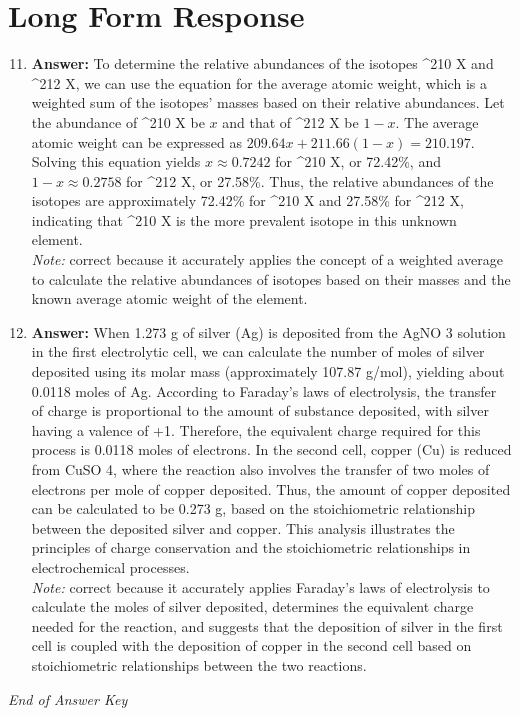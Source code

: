 \documentclass[12pt]{article}
\begin{document}
\section*{Long Form Response}
\begin{enumerate}[label=\arabic*.]
\setcounter{enumi}{10}
\item \textbf{Answer:} To determine the relative abundances of the isotopes ^210 X and ^212 X, we can use the equation for the average atomic weight, which is a weighted sum of the isotopes' masses based on their relative abundances. Let the abundance of ^210 X be \( x \) and that of ^212 X be \( 1-x \). The average atomic weight can be expressed as \( 209.64 x + 211.66(1 - x) = 210.197 \). Solving this equation yields \( x \approx 0.7242 \) for ^210 X, or 72.42\%, and \( 1 - x \approx 0.2758 \) for ^212 X, or 27.58\%. Thus, the relative abundances of the isotopes are approximately 72.42\% for ^210 X and 27.58\% for ^212 X, indicating that ^210 X is the more prevalent isotope in this unknown element.
\\ \textit{Note:} correct because it accurately applies the concept of a weighted average to calculate the relative abundances of isotopes based on their masses and the known average atomic weight of the element.
\item \textbf{Answer:} When 1.273 g of silver (Ag) is deposited from the AgNO 3 solution in the first electrolytic cell, we can calculate the number of moles of silver deposited using its molar mass (approximately 107.87 g/mol), yielding about 0.0118 moles of Ag. According to Faraday's laws of electrolysis, the transfer of charge is proportional to the amount of substance deposited, with silver having a valence of +1. Therefore, the equivalent charge required for this process is 0.0118 moles of electrons. In the second cell, copper (Cu) is reduced from CuSO 4, where the reaction also involves the transfer of two moles of electrons per mole of copper deposited. Thus, the amount of copper deposited can be calculated to be 0.273 g, based on the stoichiometric relationship between the deposited silver and copper. This analysis illustrates the principles of charge conservation and the stoichiometric relationships in electrochemical processes.
\\ \textit{Note:} correct because it accurately applies Faraday's laws of electrolysis to calculate the moles of silver deposited, determines the equivalent charge needed for the reaction, and suggests that the deposition of silver in the first cell is coupled with the deposition of copper in the second cell based on stoichiometric relationships between the two reactions.
\end{enumerate}

\vfill
\noindent\textit{End of Answer Key}
\end{document}
